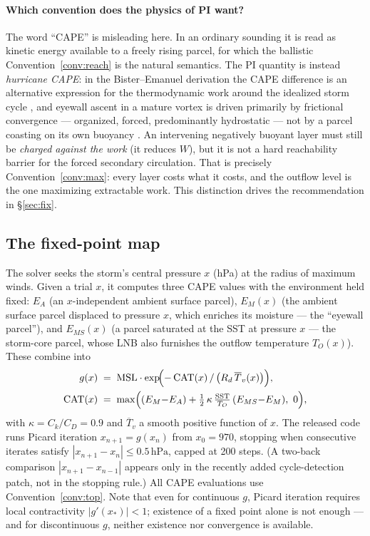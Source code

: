 \documentclass[11pt,a4paper]{article}
\theoremstyle{definition}
\newcommand{\hPa}{\,\mathrm{hPa}}
\begin{document}
\paragraph{Which convention does the physics of PI want?}
The word ``CAPE'' is misleading here.  In an ordinary sounding it is read as
kinetic energy available to a freely rising parcel, for which the ballistic
Convention~\ref{conv:reach} is the natural semantics.  The PI quantity is
instead \emph{hurricane CAPE}: in the Bister--Emanuel derivation the CAPE
difference is an alternative expression for the thermodynamic work around
the idealized storm cycle \cite{bisteremanuel2002,gilford2021}, and eyewall
ascent in a mature vortex is driven primarily by frictional convergence ---
organized, forced, predominantly hydrostatic --- not by a parcel coasting on
its own buoyancy \cite{garner2015}.  An intervening negatively buoyant layer
must still be \emph{charged against the work} (it reduces $W$), but it is
not a hard reachability barrier for the forced secondary circulation.  That
is precisely Convention~\ref{conv:max}: every layer costs what it costs,
and the outflow level is the one maximizing extractable work.  This
distinction drives the recommendation in \S\ref{sec:fix}.

\subsection{The fixed-point map}\label{sec:map}

The solver seeks the storm's central pressure $x$ (hPa) at the radius of
maximum winds.  Given a trial $x$, it computes three CAPE values with the
environment held fixed: $E_A$ (an $x$-independent ambient surface parcel),
$E_M(x)$ (the ambient surface parcel displaced to pressure $x$, which
enriches its moisture --- the ``eyewall parcel''), and $E_{MS}(x)$ (a parcel
saturated at the SST at pressure $x$ --- the storm-core parcel, whose LNB
also furnishes the outflow temperature $T_O(x)$).  These combine into
\begin{equation}\label{eq:g}
\begin{aligned}
g(x) \;&=\; \mathrm{MSL}\cdot
\exp\!\Bigl(-\,\mathrm{CAT}(x)\,/\,\bigl(R_d\,\overline{T}_v(x)\bigr)\Bigr),\\
\mathrm{CAT}(x)\;&=\;\max\Bigl((E_M{-}E_A)+\tfrac12\,\kappa\,
\tfrac{\mathrm{SST}}{T_O}\,(E_{MS}{-}E_M),\ 0\Bigr),
\end{aligned}
\end{equation}
with $\kappa=C_k/C_D=0.9$ and $\overline{T}_v$ a smooth positive function of
$x$.  The released code runs Picard iteration $x_{n+1}=g(x_n)$ from
$x_0=970$, stopping when consecutive iterates satisfy
$|x_{n+1}-x_{n}|\le 0.5\hPa$, capped at 200 steps.  (A two-back comparison
$|x_{n+1}-x_{n-1}|$ appears only in the recently added cycle-detection
patch, not in the stopping rule.)  All CAPE evaluations use
Convention~\ref{conv:top}.  Note that even for continuous $g$, Picard
iteration requires local contractivity $|g'(x_*)|<1$; existence of a fixed
point alone is not enough --- and for discontinuous $g$, neither existence
nor convergence is available.
\end{document}
